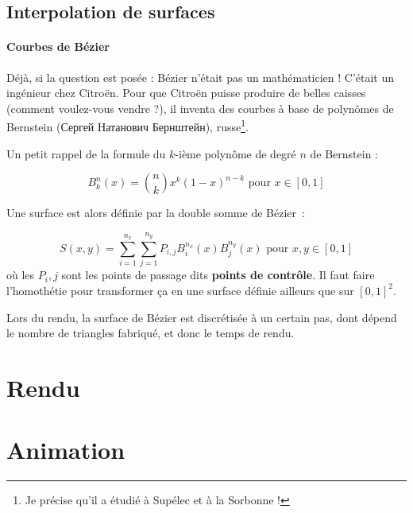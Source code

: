 \documentclass[a4paper, 10pt]{article}
\begin{document}
\subsection{Interpolation de surfaces}

\paragraph{Courbes de Bézier}
Déjà, si la question est posée : Bézier n'était pas un mathématicien ! C'était
un ingénieur chez Citroën. Pour que Citroën puisse produire de belles caisses 
(comment voulez-vous vendre ?), il inventa des courbes à base de polynômes
de Bernstein (\foreignlanguage{russian}{Сергей Натанович Бернштейн}), 
russe\footnote{Je précise qu'il a étudié à Supélec et à la Sorbonne !}.

Un petit rappel de la formule du $k$-ième polynôme de degré $n$ de Bernstein : 

$$
B_k^n(x) = \binom{n}{k} x^k \left(1-x\right)^{n-k} \text{ pour } x \in [0,1]
$$

Une surface est alors définie par la double somme de Bézier~:

$$
S(x, y) = \sum_{i=1}^{n_x}\sum_{j=1}^{n_y} P_{i,j} B_i^{n_x}(x) B_j^{n_y}(x)
\text{ pour } x,y \in [0,1]
$$
où les $P_i,j$ sont les points de passage dits \textbf{points de contrôle}.
Il faut faire l'homothétie pour transformer ça en une surface définie ailleurs
que sur $[0,1]^2$.

Lors du rendu, la surface de Bézier est discrétisée à un certain pas, dont
dépend le nombre de triangles fabriqué, et donc le temps de rendu.

\section{Rendu}

\section{Animation}
\end{document}
